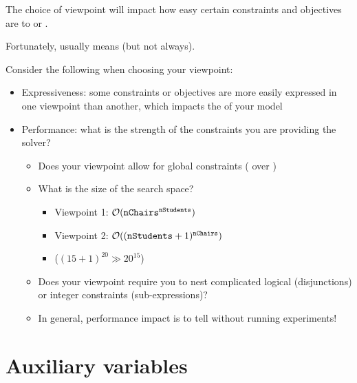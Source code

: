 \documentclass{cons-beamer}
\begin{document}
\begin{frame}

  \parBreak

  The choice of viewpoint will impact how easy certain constraints and objectives are to  or .

  \parBreak
  Fortunately,  usually means  (but not always).


  \parBreak

  Consider the following when choosing your viewpoint:

  \begin{itemize}
    \item Expressiveness: some constraints or objectives are more easily expressed in one viewpoint than another, which impacts the  of your model
    \item Performance: what is the strength of the constraints you are providing the solver?
      \begin{itemize}
        \item Does your viewpoint allow for  global constraints (\eg {} over )
        \item What is the size of the search space?
          \begin{itemize}
            \item Viewpoint 1: $\mathcal{O}(\mathtt{nChairs}^{\mathtt{nStudents}})$
            \item Viewpoint 2: $\mathcal{O}((\mathtt{nStudents} + 1)^{\mathtt{nChairs}})$
            \item ($(15+1)^{20} \gg 20^{15}$)
          \end{itemize}
        \item Does your viewpoint require you to nest complicated logical (\eg disjunctions) or integer constraints (\eg sub-expressions)?
        \item In general, performance impact is  to tell without running experiments!
      \end{itemize}
  \end{itemize}
\end{frame}

\section{Auxiliary variables}
\end{document}
